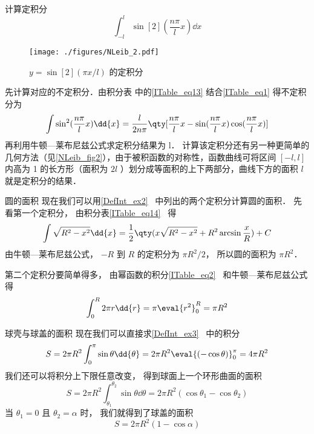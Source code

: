 \begin{example}{计算定积分}
\begin{equation}
\int_{-l}^l \sin[2](\frac{n\pi}{l} x) \dd{x}
\end{equation}

\begin{figure}[ht]
\centering
\texttt{[image: ./figures/NLeib\_2.pdf]}
\caption{$y = \sin[2](\pi x/l)$ 的定积分}\label{NLeib_fig2}
\end{figure}

先计算对应的不定积分．由积分表 中的\autoref{ITable_eq13} 结合\autoref{ITable_eq1} 得不定积分为
\begin{equation}
\int\sin^2(\frac{n\pi}{l} x) \dd{x} = \frac{l}{2n\pi} \qty[\frac{n\pi}{l} x - \sin(\frac{n\pi}{l} x)\cos(\frac{n\pi}{l} x)]
\end{equation}
再利用牛顿—莱布尼兹公式求定积分结果为 l． 计算该定积分还有另一种更简单的几何方法（见\autoref{NLeib_fig2}），由于被积函数的对称性，函数曲线可将区间 $[-l,l]$ 内高为 1 的长方形（面积为 $2l$ ）划分成等面积的上下两部分，曲线下方的面积 $l$ 就是定积分的结果．
\end{example}

\begin{example}{圆的面积}\label{NLeib_ex2}
现在我们可以用\autoref{DefInt_ex2}~ 中列出的两个定积分计算圆的面积． 先看第一个定积分， 由积分表\autoref{ITable_eq14}~ 得
\begin{equation}
\int \sqrt{R^2 - x^2} \dd{x} = \frac12 \qty(x\sqrt{R^2 - x^2} + R^2\arcsin\frac{x}{R}) + C
\end{equation}
由牛顿—莱布尼兹公式， $-R$ 到 $R$ 的定积分为 $\pi R^2/2$， 所以圆的面积为 $\pi R^2$．

第二个定积分要简单得多， 由幂函数的积分\autoref{ITable_eq2}~ 和牛顿—莱布尼兹公式得
\begin{equation}
\int_0^R 2\pi r \dd{r} = \pi \eval{r^2}_0^R = \pi R^2
\end{equation}
\end{example}

\begin{example}{球壳与球盖的面积}\label{NLeib_ex3}
现在我们可以直接求\autoref{DefInt_ex3}~ 中的积分
\begin{equation}
S = 2\pi R^2 \int_0^{\pi} \sin\theta \dd{\theta} = 2\pi R^2 \eval{(-\cos\theta)}_0^\pi = 4\pi R^2
\end{equation}
我们还可以将积分上下限任意改变， 得到球面上一个环形曲面的面积
\begin{equation}
S = 2\pi R^2 \int_{\theta_1}^{\theta_2} \sin\theta \dd{\theta} = 2\pi R^2 (\cos{\theta_1} - \cos{\theta_2})
\end{equation}
当 $\theta_1 = 0$ 且 $\theta_2 = \alpha$ 时， 我们就得到了球盖的面积
\begin{equation}
S = 2\pi R^2 (1 - \cos\alpha)
\end{equation}
\end{example}

